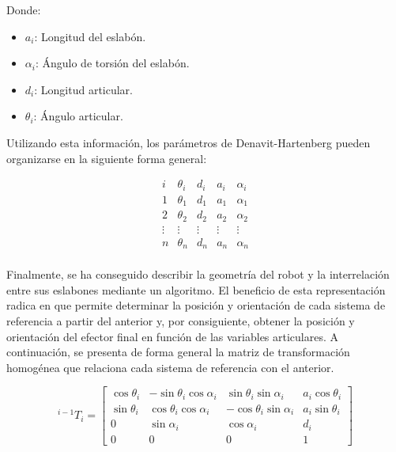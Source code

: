 \documentclass{article}
\begin{document}
\medskip

Donde:

\begin{itemize}
    \item $a_i$: Longitud del eslabón.
    \item $\alpha_i$: Ángulo de torsión del eslabón.
    \item $d_i$: Longitud articular.
    \item $\theta_i$: Ángulo articular.
\end{itemize}

Utilizando esta información, los parámetros de Denavit-Hartenberg pueden organizarse en la siguiente forma general:

\begin{equation}
\begin{array}{c|cccc}
i & \theta_i & d_i & a_i & \alpha_i \\
\hline
1 & \theta_1 & d_1 & a_1 & \alpha_1 \\
2 & \theta_2 & d_2 & a_2 & \alpha_2 \\
\vdots & \vdots & \vdots & \vdots & \vdots \\
n & \theta_n & d_n & a_n & \alpha_n \\
\end{array}
\end{equation}

Finalmente, se ha conseguido describir la geometría del robot y la interrelación entre sus eslabones mediante un algoritmo. El beneficio de esta representación radica en que permite determinar la posición y orientación de cada sistema de referencia a partir del anterior y, por consiguiente, obtener la posición y orientación del efector final en función de las variables articulares. A continuación, se presenta de forma general la matriz de transformación homogénea que relaciona cada sistema de referencia con el anterior.

\begin{equation}
{}^{i-1}T_i =
\begin{bmatrix}
\cos\theta_i & -\sin\theta_i \cos\alpha_i & \sin\theta_i \sin\alpha_i & a_i \cos\theta_i \\
\sin\theta_i & \cos\theta_i \cos\alpha_i  & -\cos\theta_i \sin\alpha_i & a_i \sin\theta_i \\
0            & \sin\alpha_i               & \cos\alpha_i               & d_i \\
0            & 0                          & 0                          & 1
\end{bmatrix}
\end{equation}
\end{document}
